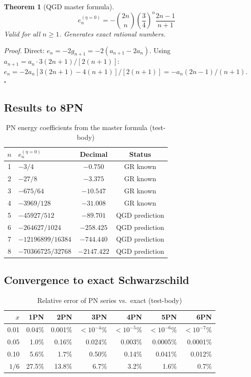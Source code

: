 \documentclass[11pt,a4paper]{article}
\theoremstyle{plain}
\newtheorem{theorem}{Theorem}[section]
\theoremstyle{definition}
\theoremstyle{remark}
\begin{document}
\begin{theorem}[QGD master formula]\label{thm:master}
  \begin{equation}
    \boxed{e_n^{(\eta=0)} = -\binom{2n}{n}\left(\frac{3}{4}\right)^n\frac{2n-1}{n+1}}
  \end{equation}
  Valid for all $n \geq 1$.  Generates exact rational numbers.
\end{theorem}

\emph{Proof.}  Direct: $e_n = -2g_{n+1} = -2(a_{n+1} - 2a_n)$.  Using $a_{n+1} = a_n\cdot3(2n+1)/[2(n+1)]$: $e_n = -2a_n[3(2n+1) - 4(n+1)]/[2(n+1)] = -a_n(2n-1)/(n+1)$.\hfill$\square$

\subsection{Results to 8PN}

\begin{table}[h]
  \centering
  \caption{PN energy coefficients from the master formula (test-body)}
  \begin{tabular}{@{}clcc@{}}
    \toprule
    $n$ & $e_n^{(\eta=0)}$ & Decimal & Status \\
    \midrule
    1 & $-3/4$ & $-0.750$ & GR known \\
    2 & $-27/8$ & $-3.375$ & GR known \\
    3 & $-675/64$ & $-10.547$ & GR known \\
    4 & $-3969/128$ & $-31.008$ & GR known \\
    5 & $-45927/512$ & $-89.701$ & QGD prediction \\
    6 & $-264627/1024$ & $-258.425$ & QGD prediction \\
    7 & $-12196899/16384$ & $-744.440$ & QGD prediction \\
    8 & $-70366725/32768$ & $-2147.422$ & QGD prediction \\
    \bottomrule
  \end{tabular}
\end{table}

\subsection{Convergence to exact Schwarzschild}

\begin{table}[h]
  \centering
  \caption{Relative error of PN series vs.\ exact (test-body)}
  \begin{tabular}{@{}rrrrrrr@{}}
    \toprule
    $x$ & 1PN & 2PN & 3PN & 4PN & 5PN & 6PN \\
    \midrule
    0.01 & 0.04\% & 0.001\% & $<10^{-4}$\% & $<10^{-5}$\% & $<10^{-6}$\% & $<10^{-7}$\% \\
    0.05 & 1.0\% & 0.16\% & 0.024\% & 0.003\% & 0.0005\% & 0.0001\% \\
    0.10 & 5.6\% & 1.7\% & 0.50\% & 0.14\% & 0.041\% & 0.012\% \\
    $1/6$ & 27.5\% & 13.8\% & 6.7\% & 3.2\% & 1.6\% & 0.7\% \\
    \bottomrule
  \end{tabular}
\end{table}
\end{document}
